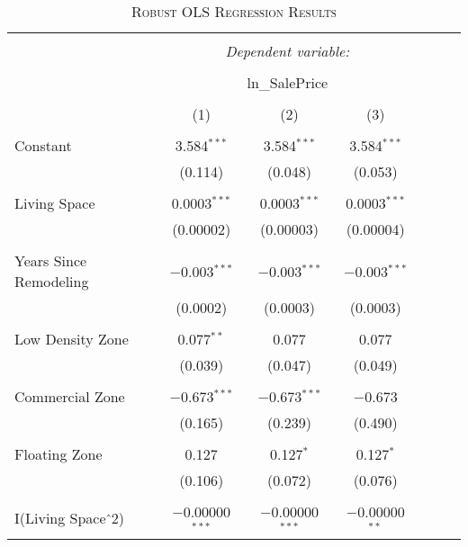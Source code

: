\documentclass[a4paper]{article}
\begin{document}
\begin{table}[!htbp] \centering 
\begin{adjustwidth}{0.5cm}{-0cm}
\begin{threeparttable}
\small
\captionsetup{font=small, justification=raggedright,singlelinecheck=false}
\caption{\textsc{Robust OLS Regression Results}}
\centering 
  \label{}
\small 
\begin{tabular}{@{\extracolsep{-7pt}}lcccccc} 
\\[-5.8ex]\hline 
\hline \\[-1.8ex] 
 & \multicolumn{3}{c}{\textit{Dependent variable:}} \\ 
\cline{2-4} 
\\[-1.8ex] & \multicolumn{3}{c}{ln\_SalePrice} \\ 
\\[-1.8ex] & (1) & (2) & (3)\\ 
\hline \\[-1.8ex] 
 Constant & 3.584$^{***}$ & 3.584$^{***}$ & 3.584$^{***}$ \\ 
  & (0.114) & (0.048) & (0.053) \\ 
  & & & \\ 
 Living Space &  0.0003$^{***}$ & 0.0003$^{***}$ & 0.0003$^{***}$ \\ 
  & (0.00002) & (0.00003) & (0.00004) \\ 
  & & & \\ 
 Years Since Remodeling & $-$0.003$^{***}$ & $-$0.003$^{***}$ & $-$0.003$^{***}$ \\ 
  & (0.0002) & (0.0003) & (0.0003) \\ 
  & & & \\ 
 Low Density Zone & 0.077$^{**}$ & 0.077 & 0.077 \\ 
  & (0.039) & (0.047) & (0.049) \\ 
  & & & \\ 
 Commercial Zone & $-$0.673$^{***}$ & $-$0.673$^{***}$ & $-$0.673 \\ 
  & (0.165) & (0.239) & (0.490) \\ 
  & & & \\ 
 Floating Zone & 0.127 & 0.127$^{*}$ & 0.127$^{*}$ \\ 
  & (0.106) & (0.072) & (0.076) \\ 
  & & & \\ 
 I(Living Space$\hat{\mkern6mu}$2) & $-$0.00000$^{***}$ & $-$0.00000$^{***}$ & $-$0.00000$^{**}$ \\ 

\end{tabular}
\end{threeparttable}
\end{adjustwidth}
\end{table}
\end{document}

